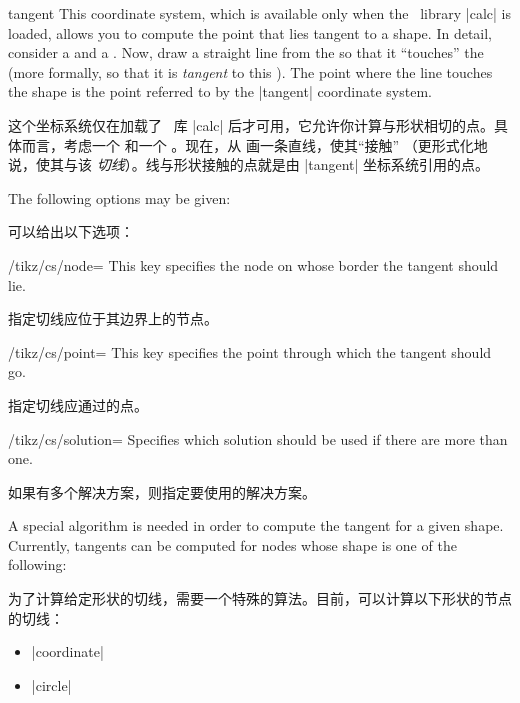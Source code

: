 \begin{coordinatesystem}{tangent}
    This coordinate system, which is available only when the \tikzname\ library
    |calc| is loaded, allows you to compute the point that lies tangent to a
    shape. In detail, consider a  and a . Now, draw a
    straight line from the  so that it ``touches'' the 
    (more formally, so that it is \emph{tangent} to this ). The
    point where the line touches the shape is the point referred to by the
    |tangent| coordinate system.

    这个坐标系统仅在加载了 \tikzname\ 库 |calc| 后才可用，它允许你计算与形状相切的点。具体而言，考虑一个  和一个 。现在，从  画一条直线，使其“接触” （更形式化地说，使其与该  \emph{切线}）。线与形状接触的点就是由 |tangent| 坐标系统引用的点。



    The following options may be given:

    可以给出以下选项：

    \begin{key}{/tikz/cs/node=}
        This key specifies the node on whose border the tangent should lie.

        指定切线应位于其边界上的节点。

    \end{key}
    \begin{key}{/tikz/cs/point=}
        This key specifies the point through which the tangent should go.

        指定切线应通过的点。
    \end{key}
    \begin{key}{/tikz/cs/solution=}
        Specifies which solution should be used if there are more than one.

        如果有多个解决方案，则指定要使用的解决方案。
    \end{key}

    A special algorithm is needed in order to compute the tangent for a given
    shape. Currently, tangents can be computed for nodes whose shape is one of
    the following:

    为了计算给定形状的切线，需要一个特殊的算法。目前，可以计算以下形状的节点的切线：
    \begin{itemize}
        \item |coordinate|
        \item |circle|
    \end{itemize}
\begin{codeexample}[preamble={\usetikzlibrary{calc}}]
\end{codeexample}
\end{coordinatesystem}
